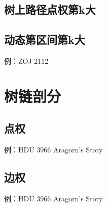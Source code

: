 \subsection{树上路径点权第k大}


\subsection{动态第区间第k大}
例：ZOJ 2112


\section{树链剖分}
\subsection{点权}
例：HDU 3966 Aragorn’s Story


\subsection{边权}
例：HDU 3966 Aragorn’s Story



\endinput %
